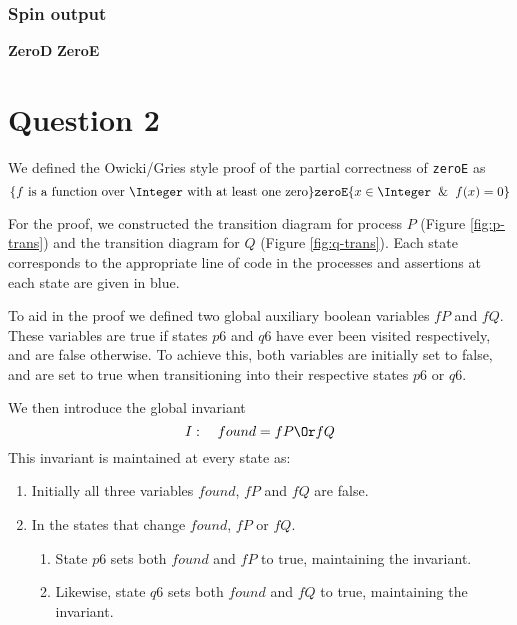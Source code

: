 \documentclass[12pt,a4paper]{scrartcl}
\begin{document}
\subsubsection{Spin output}

\textbf{ZeroD}
\textbf{ZeroE}

\section{Question 2}
We defined the Owicki/Gries style proof of the partial correctness of \texttt{zeroE} as
\begin{equation}
    \{ \textrm{$f$ is a function over $\Integer$ with at least one zero} \}
    \texttt{zeroE}
    \{ x \in \Integer \And f(x)=0 \}
\label{eq:og-proof}
\end{equation}

For the proof, we constructed the transition diagram for process $P$ (Figure \ref{fig:p-trans}) and the transition diagram for $Q$ (Figure \ref{fig:q-trans}).
Each state corresponds to the appropriate line of code in the processes and assertions at each state are given in blue.

To aid in the proof we defined two global auxiliary boolean variables $fP$ and $fQ$.
These variables are true if states $p6$ and $q6$ have ever been visited respectively, and are false otherwise.
To achieve this, both variables are initially set to false, and are set to true when transitioning into their respective states $p6$ or $q6$.

We then introduce the global invariant
\begin{equation}
    I: \quad found = fP \Or fQ
\label{eq:og-invariant}
\end{equation}
This invariant is maintained at every state as:
\begin{enumerate}
    \item Initially all three variables $found$, $fP$ and $fQ$ are false.
    \item In the states that change $found$, $fP$ or $fQ$.
    \begin{enumerate}
        \item State $p6$ sets both $found$ and $fP$ to true, maintaining the invariant.
        \item Likewise, state $q6$ sets both $found$ and $fQ$ to true, maintaining the invariant.
    \end{enumerate}
\end{enumerate}
\end{document}
